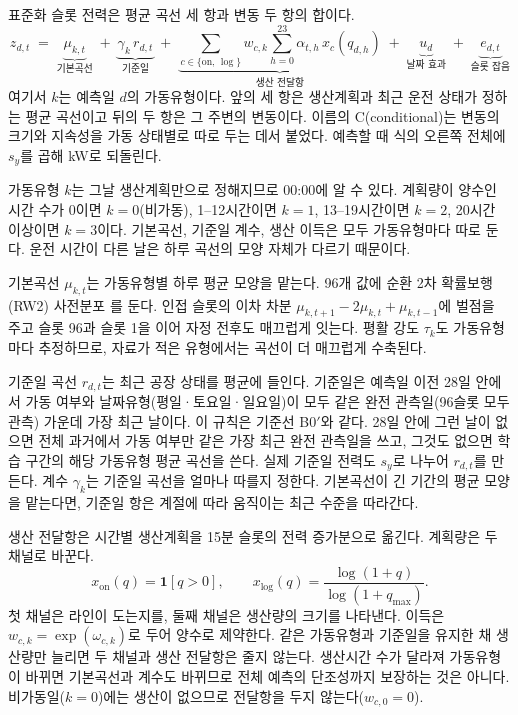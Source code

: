 표준화 슬롯 전력은 평균 곡선 세 항과 변동 두 항의 합이다.
\begin{equation}
z_{d,t} \;=\; \underbrace{\mu_{k,t}}_{\text{기본곡선}}
\;+\; \underbrace{\gamma_k\, r_{d,t}}_{\text{기준일}}
\;+\; \underbrace{\sum_{c\in\{\mathrm{on},\,\log\}} w_{c,k} \sum_{h=0}^{23} \alpha_{t,h}\, x_c(q_{d,h})}_{\text{생산 전달항}}
\;+\; \underbrace{u_d}_{\text{날짜 효과}}
\;+\; \underbrace{e_{d,t}}_{\text{슬롯 잡음}}
\label{eq:ch2-cbat}
\end{equation}
여기서 $k$는 예측일 $d$의 가동유형이다. 앞의 세 항은 생산계획과 최근 운전 상태가 정하는 평균 곡선이고 뒤의 두 항은 그 주변의 변동이다. 이름의 C(conditional)는 변동의 크기와 지속성을 가동 상태별로 따로 두는 데서 붙었다. 예측할 때 식의 오른쪽 전체에 $s_y$를 곱해 kW로 되돌린다.

가동유형 $k$는 그날 생산계획만으로 정해지므로 00:00에 알 수 있다. 계획량이 양수인 시간 수가 0이면 $k=0$(비가동), 1--12시간이면 $k=1$, 13--19시간이면 $k=2$, 20시간 이상이면 $k=3$이다. 기본곡선, 기준일 계수, 생산 이득은 모두 가동유형마다 따로 둔다. 운전 시간이 다른 날은 하루 곡선의 모양 자체가 다르기 때문이다.

기본곡선 $\mu_{k,t}$는 가동유형별 하루 평균 모양을 맡는다. 96개 값에 순환 2차 확률보행(RW2) 사전분포 \citep{rue2005gmrf}를 둔다. 인접 슬롯의 이차 차분 $\mu_{k,t+1}-2\mu_{k,t}+\mu_{k,t-1}$에 벌점을 주고 슬롯 96과 슬롯 1을 이어 자정 전후도 매끄럽게 잇는다. 평활 강도 $\tau_k$도 가동유형마다 추정하므로, 자료가 적은 유형에서는 곡선이 더 매끄럽게 수축된다.

기준일 곡선 $r_{d,t}$는 최근 공장 상태를 평균에 들인다. 기준일은 예측일 이전 28일 안에서 가동 여부와 날짜유형(평일·토요일·일요일)이 모두 같은 완전 관측일(96슬롯 모두 관측) 가운데 가장 최근 날이다. 이 규칙은 기준선 B0$'$와 같다. 28일 안에 그런 날이 없으면 전체 과거에서 가동 여부만 같은 가장 최근 완전 관측일을 쓰고, 그것도 없으면 학습 구간의 해당 가동유형 평균 곡선을 쓴다. 실제 기준일 전력도 $s_y$로 나누어 $r_{d,t}$를 만든다. 계수 $\gamma_k$는 기준일 곡선을 얼마나 따를지 정한다. 기본곡선이 긴 기간의 평균 모양을 맡는다면, 기준일 항은 계절에 따라 움직이는 최근 수준을 따라간다.

생산 전달항은 시간별 생산계획을 15분 슬롯의 전력 증가분으로 옮긴다. 계획량은 두 채널로 바꾼다.
\begin{equation}
x_{\mathrm{on}}(q)=\mathbf 1[q>0],\qquad
x_{\log}(q)=\frac{\log(1+q)}{\log(1+q_{\max})}.
\label{eq:ch2-channels}
\end{equation}
첫 채널은 라인이 도는지를, 둘째 채널은 생산량의 크기를 나타낸다. 이득은 $w_{c,k}=\exp(\omega_{c,k})$로 두어 양수로 제약한다. 같은 가동유형과 기준일을 유지한 채 생산량만 늘리면 두 채널과 생산 전달항은 줄지 않는다. 생산시간 수가 달라져 가동유형이 바뀌면 기본곡선과 계수도 바뀌므로 전체 예측의 단조성까지 보장하는 것은 아니다. 비가동일($k=0$)에는 생산이 없으므로 전달항을 두지 않는다($w_{c,0}=0$).

